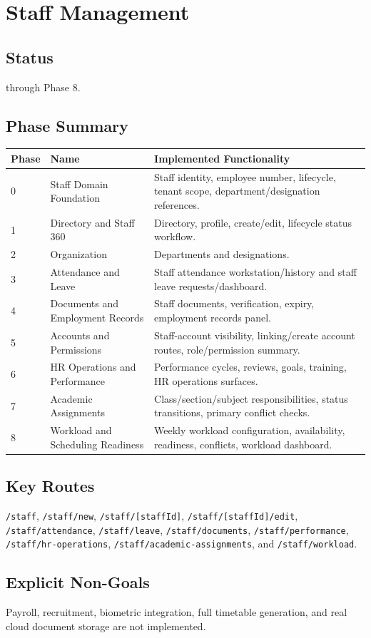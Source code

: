 \chapter{Staff Management}
\section{Status}
\statusimplemented{} through Phase 8.



\section{Phase Summary}
\begin{longtable}{@{}p{}p{}p{}@{}}
\toprule
\textbf{Phase} & \textbf{Name} & \textbf{Implemented Functionality}\\
\midrule
0 & Staff Domain Foundation & Staff identity, employee number, lifecycle, tenant scope, department/designation references.\\
1 & Directory and Staff 360 & Directory, profile, create/edit, lifecycle status workflow.\\
2 & Organization & Departments and designations.\\
3 & Attendance and Leave & Staff attendance workstation/history and staff leave requests/dashboard.\\
4 & Documents and Employment Records & Staff documents, verification, expiry, employment records panel.\\
5 & Accounts and Permissions & Staff-account visibility, linking/create account routes, role/permission summary.\\
6 & HR Operations and Performance & Performance cycles, reviews, goals, training, HR operations surfaces.\\
7 & Academic Assignments & Class/section/subject responsibilities, status transitions, primary conflict checks.\\
8 & Workload and Scheduling Readiness & Weekly workload configuration, availability, readiness, conflicts, workload dashboard.\\
\bottomrule
\end{longtable}

\section{Key Routes}
\texttt{/staff}, \texttt{/staff/new}, \texttt{/staff/[staffId]}, \texttt{/staff/[staffId]/edit}, \texttt{/staff/attendance}, \texttt{/staff/leave}, \texttt{/staff/documents}, \texttt{/staff/performance}, \texttt{/staff/hr-operations}, \texttt{/staff/academic-assignments}, and \texttt{/staff/workload}.

\section{Explicit Non-Goals}
\statusnot{} Payroll, recruitment, biometric integration, full timetable generation, and real cloud document storage are not implemented.
